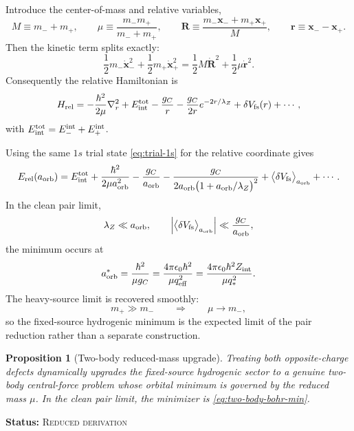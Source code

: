 \documentclass[11pt]{article}
\theoremstyle{plain}
\newtheorem{proposition}[theorem]{Proposition}
\theoremstyle{definition}
\theoremstyle{remark}
\newcommand{\statusReduced}{\textsc{Reduced derivation}}
\newcommand{\claimstatus}[1]{\par\smallskip\noindent\textbf{Status:} #1\par\smallskip}
\newcommand{\aorb}{a_{\mathrm{orb}}}
\newcommand{\qeff}{q_{\mathrm{eff}}}
\newcommand{\qstar}{q_*}
\begin{document}
Introduce the center-of-mass and relative variables,
\begin{equation}
M\equiv m_-+m_+,
\qquad
\mu\equiv \frac{m_-m_+}{m_-+m_+},
\qquad
\mathbf R\equiv \frac{m_-\mathbf x_-+m_+\mathbf x_+}{M},
\qquad
\mathbf r\equiv \mathbf x_- - \mathbf x_+.
\label{eq:pair-cm-relative}
\end{equation}
Then the kinetic term splits exactly:
\begin{equation}
\frac12 m_- \dot{\mathbf x}_-^{2}+\frac12 m_+ \dot{\mathbf x}_+^{2}
=
\frac12 M\dot{\mathbf R}^{2}+\frac12 \mu\dot{\mathbf r}^{2}.
\label{eq:pair-kinetic-split}
\end{equation}
Consequently the relative Hamiltonian is
\begin{equation}
H_{\rm rel}
=
-\frac{\hbar^2}{2\mu}\nabla_r^2
+E_{\rm int}^{\rm tot}
-\frac{g_C}{r}
-\frac{g_C}{2r}e^{-2r/\lambda_Z}
+\delta V_{\rm fs}(r)
+\cdots,
\label{eq:relative-hamiltonian}
\end{equation}
with $E_{\rm int}^{\rm tot}=E_-^{\rm int}+E_+^{\rm int}$.

Using the same $1s$ trial state \cref{eq:trial-1s} for the relative coordinate gives
\begin{equation}
E_{\rm rel}(\aorb)
=
E_{\rm int}^{\rm tot}
+\frac{\hbar^2}{2\mu\aorb^2}
-\frac{g_C}{\aorb}
-\frac{g_C}{2\aorb\bigl(1+\aorb/\lambda_Z\bigr)^2}
+\bigl\langle \delta V_{\rm fs}\bigr\rangle_{\aorb}
+\cdots.
\label{eq:relative-energy-functional}
\end{equation}
In the clean pair limit,
\begin{equation}
\lambda_Z\ll \aorb,
\qquad
\left|\bigl\langle \delta V_{\rm fs}\bigr\rangle_{\aorb}\right|
\ll
\frac{g_C}{\aorb},
\label{eq:clean-pair-limit}
\end{equation}
the minimum occurs at
\begin{equation}
\aorb^*
=
\frac{\hbar^2}{\mu g_C}
=
\frac{4\pi\epsilon_0\hbar^2}{\mu\qeff^2}
=
\frac{4\pi\epsilon_0\hbar^2 Z_{\rm int}}{\mu\qstar^2}.
\label{eq:two-body-bohr-min}
\end{equation}
The heavy-source limit is recovered smoothly:
\begin{equation}
m_+\gg m_-
\qquad\Longrightarrow\qquad
\mu\to m_-,
\label{eq:heavy-source-limit}
\end{equation}
so the fixed-source hydrogenic minimum is the expected limit of the pair reduction rather than a separate construction.

\begin{proposition}[Two-body reduced-mass upgrade]\label{prop:two-body-reduced-mass-upgrade}
Treating both opposite-charge defects dynamically upgrades the fixed-source hydrogenic sector to a genuine two-body central-force problem whose orbital minimum is governed by the reduced mass $\mu$. In the clean pair limit, the minimizer is \cref{eq:two-body-bohr-min}.
\end{proposition}
\claimstatus{\statusReduced}
\end{document}
